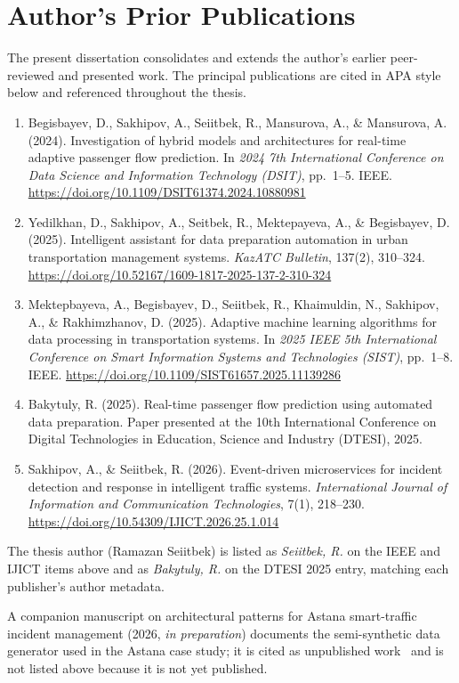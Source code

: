 %
%
\chapter{Author's Prior Publications}
\label{app:publications}

The present dissertation consolidates and extends the author's earlier peer-reviewed and presented work. The principal publications are cited in APA style below and referenced throughout the thesis.

\begin{enumerate}
  \item Begisbayev, D., Sakhipov, A., Seiitbek, R., Mansurova, A., \& Mansurova, A. (2024). Investigation of hybrid models and architectures for real-time adaptive passenger flow prediction. In \emph{2024 7th International Conference on Data Science and Information Technology (DSIT)}, pp.\ 1--5. IEEE. \url{https://doi.org/10.1109/DSIT61374.2024.10880981}
  \item Yedilkhan, D., Sakhipov, A., Seitbek, R., Mektepayeva, A., \& Begisbayev, D. (2025). Intelligent assistant for data preparation automation in urban transportation management systems. \emph{KazATC Bulletin}, 137(2), 310--324. \url{https://doi.org/10.52167/1609-1817-2025-137-2-310-324}
  \item Mektepbayeva, A., Begisbayev, D., Seiitbek, R., Khaimuldin, N., Sakhipov, A., \& Rakhimzhanov, D. (2025). Adaptive machine learning algorithms for data processing in transportation systems. In \emph{2025 IEEE 5th International Conference on Smart Information Systems and Technologies (SIST)}, pp.\ 1--8. IEEE. \url{https://doi.org/10.1109/SIST61657.2025.11139286}
  \item Bakytuly, R. (2025). Real-time passenger flow prediction using automated data preparation. Paper presented at the 10th International Conference on Digital Technologies in Education, Science and Industry (DTESI), 2025.
  \item Sakhipov, A., \& Seiitbek, R. (2026). Event-driven microservices for incident detection and response in intelligent traffic systems. \emph{International Journal of Information and Communication Technologies}, 7(1), 218--230. \url{https://doi.org/10.54309/IJICT.2026.25.1.014}
\end{enumerate}

\noindent The thesis author (Ramazan Seiitbek) is listed as \emph{Seiitbek, R.} on the IEEE and IJICT items above and as \emph{Bakytuly, R.} on the DTESI 2025 entry, matching each publisher's author metadata.

\noindent A companion manuscript on architectural patterns for Astana smart-traffic incident management (2026, \emph{in preparation}) documents the semi-synthetic data generator used in the Astana case study; it is cited as unpublished work~\cite{bakytuly2026architectural} and is not listed above because it is not yet published.
